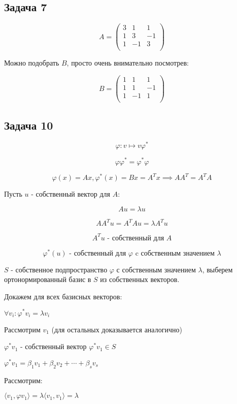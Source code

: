 \documentclass[a4paper,12pt]{article}
\begin{document}
\subsection{Задача 7}

\[
A = \begin{pmatrix}
    3 & 1 & 1 \\
    1 & 3 & -1 \\
    1 & -1 & 3 \\
\end{pmatrix}
\]

Можно подобрать $B$, просто очень внимательно посмотрев:

\[
B = \begin{pmatrix}
    1 & 1 & 1 \\
    1 & 1 & -1 \\
    1 & -1 & 1 \\
\end{pmatrix}
\]

\subsection{Задача 10}
\[
\varphi: v \mapsto v\varphi^* 
\]

\[
\varphi \varphi^* = \varphi^*\varphi
\]

\[
\varphi(x) = Ax, \varphi^*(x) = Bx = A^Tx \implies AA^T = A^TA
\]

Пусть $u$ - собственный вектор для $A$:

\[
Au = \lambda u
\]

\[
AA^Tu = A^TAu = \lambda A^Tu
\]

\[
A^Tu \text{ - собственный для } A
\]

\[
\varphi^*(u) \text{ - собственный для } \varphi \text{ c собственным значением } \lambda
\]

$S$ - собственное подпространство $\varphi$ с собственным значением $\lambda$, выберем ортонормированный базис в $S$ из собственных векторов.

Докажем для всех базисных векторов:

$\forall v_i: \varphi^*v_i = \lambda v_i$

Рассмотрим $v_1$ (для остальных доказывается аналогично)

$\varphi^*v_1$ - собственный вектор $\varphi^*v_1 \in S$

$\varphi^*v_1 = \beta_1 v_1 + \beta_2 v_2 + \cdots + \beta_s v_s$

Рассмотрим:

$\langle v_1, \varphi v_1 \rangle = \lambda \langle v_1, v_1 \rangle = \lambda$
\end{document}
